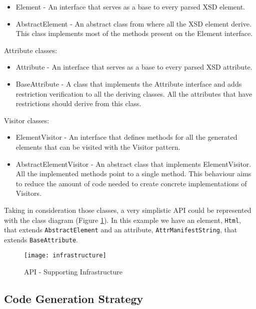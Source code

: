 \begin{itemize}  
	\item Element - An interface that serves as a base to every parsed \ac{XSD} element.
	\item AbstractElement - An abstract class from where all the \ac{XSD} element derive. This class implements most of the methods present on the Element interface.
\end{itemize}

Attribute classes:

\begin{itemize}  
	\item Attribute - An interface that serves as a base to every parsed \ac{XSD} attribute.
	\item BaseAttribute - A class that implements the Attribute interface and adds restriction verification to all the deriving classes. All the attributes that have restrictions should derive from this class.
\end{itemize}

Visitor classes:

\begin{itemize}
	\item ElementVisitor - An interface that defines methods for all the generated elements that can be visited with the Visitor pattern. 
	\item AbstractElementVisitor - An abstract class that implements ElementVisitor. All the implemented methods point to a single method. This behaviour aims to reduce the amount of code needed to create concrete implementations of  Visitors.
\end{itemize}

\noindent
Taking in consideration those classes, a very simplistic \ac{API} could be represented with the class diagram (Figure \ref{img:infrastructure}). In this example we have an element, \texttt{Html}, that extends \texttt{AbstractElement} and an attribute, \texttt{AttrManifestString}, that extends \texttt{BaseAttribute}. 

\begin{figure}[h]
	\centering
	\texttt{[image: infrastructure]}
	\caption{API - Supporting Infrastructure}
	\label{img:infrastructure}
\end{figure}

\subsection{Code Generation Strategy}
\label{sec:codegenerationstrategy}

